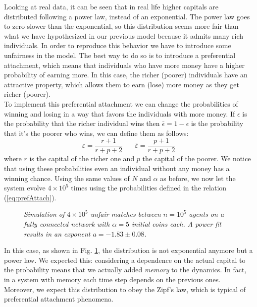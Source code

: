 Looking at real data, it can be seen that in real life higher capitals are distributed following a power law, instead of an exponential.
The power law goes to zero slower than the exponential, so this distribution seems more fair than what we have hypothesized in our previous model because it admits many rich individuals.
In order to reproduce this behavior we have to introduce some unfairness in the model.
The best way to do so is to introduce a preferential attachment, which means that individuals who have more money have a higher probability of earning more.
In this case, the richer (poorer) individuals have an attractive property, which allows them to earn (lose) more money as they get richer (poorer). \\
To implement this preferential attachment we can change the probabilities of winning and losing in a way that favors the individuals with more money.
If $\epsilon$ is the probability that the richer individual wins then $\bar{\epsilon} = 1 - \epsilon$ is the probability that it's the poorer who wins, we can define them as follows:
\begin{equation}
	\varepsilon = \frac{r + 1}{r + p + 2} \ \ \ \ \ \ \ \  \bar{\varepsilon} = \frac{p + 1}{r + p + 2}
	\label{eq:prefAttach}
\end{equation}
where $r$ is the capital of the richer one and $p$ the capital of the poorer.
We notice that using these probabilities even an individual without any money has a winning chance.
Using the same values of $N$ and $\alpha$ as before, we now let the system evolve $4 \times 10^5$ times using the probabilities defined in the relation (\ref{eq:prefAttach}).
\begin{figure}[H]
    \centering
    \scalebox{.7}{}
    \caption{\emph{Simulation of $4 \times 10^5$ unfair matches between $n = 10^5$ agents on a fully connected network with $\alpha = 5$ initial coins each. 
                    A power fit results in an exponent $a = -1.83 \pm 0.08$.}}
    \label{fig:prefAttach}
\end{figure}
In this case, as shown in Fig. \ref{fig:prefAttach}, the distribution is not exponential anymore but a power law.
We expected this: considering a dependence on the actual capital to the probability means that we actually added \emph{memory} to the dynamics.
In fact, in a system with memory each time step depends on the previous ones.
\\Moreover, we expect this distribution to obey the Zipf's law, which is typical of preferential attachment phenomena.
